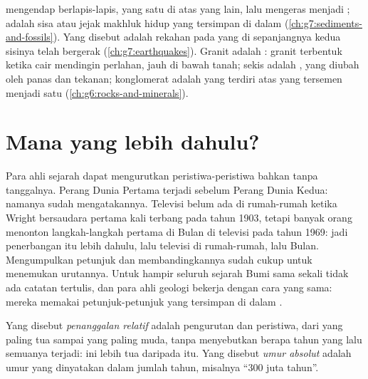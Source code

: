 \begin{recall}
 mengendap berlapis-lapis, yang satu di atas yang lain, lalu
mengeras menjadi ;  adalah sisa atau jejak makhluk hidup
yang tersimpan di dalam  (\cref{ch:g7:sediments-and-fossils}). Yang
disebut \emph{} adalah rekahan pada  yang di sepanjangnya kedua
sisinya telah bergerak (\cref{ch:g7:earthquakes}). Granit adalah
\emph{}: granit terbentuk ketika  cair mendingin perlahan,
jauh di bawah tanah; sekis adalah \emph{}, yang diubah oleh
panas dan tekanan; konglomerat adalah  yang terdiri atas
 yang tersemen menjadi satu (\cref{ch:g6:rocks-and-minerals}).
\end{recall}

\section{Mana yang lebih dahulu?}

Para ahli sejarah dapat mengurutkan peristiwa-peristiwa bahkan tanpa
tanggalnya. Perang Dunia Pertama terjadi sebelum Perang Dunia Kedua:
namanya sudah mengatakannya. Televisi belum ada di rumah-rumah ketika
Wright bersaudara pertama kali terbang pada tahun 1903, tetapi banyak orang
menonton langkah-langkah pertama di Bulan di televisi pada tahun 1969: jadi
penerbangan itu lebih dahulu, lalu televisi di rumah-rumah, lalu Bulan.
Mengumpulkan petunjuk dan membandingkannya sudah cukup untuk menemukan
urutannya. Untuk hampir seluruh sejarah Bumi sama sekali tidak ada catatan
tertulis, dan para ahli geologi bekerja dengan cara yang sama: mereka
memakai petunjuk-petunjuk yang tersimpan di dalam .

\begin{definition}\label{def:g7:geological-time:relative-dating}
Yang disebut \emph{penanggalan relatif} adalah
pengurutan  dan peristiwa, dari yang paling tua sampai yang paling
muda, tanpa menyebutkan berapa tahun yang lalu semuanya terjadi:  ini
lebih tua daripada  itu. Yang disebut \emph{umur
absolut} adalah umur yang dinyatakan dalam jumlah tahun,
misalnya ``\num{300} juta tahun''.
\end{definition}

